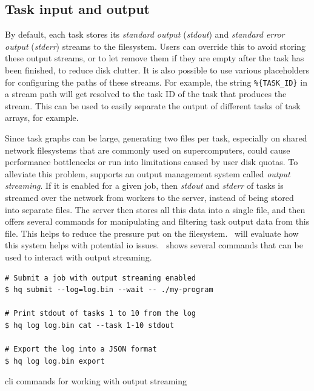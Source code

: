 \subsection{Task input and output}
\label{hq:task-input-and-output}
By default, each \hyperqueue{} task stores its \emph{standard output} (\emph{stdout}) and
\emph{standard error output} (\emph{stderr}) streams to the filesystem. Users can override this to avoid storing these
output streams, or to let \hq{} remove them if they are empty after the task has
been finished, to reduce disk clutter. It is also possible to use various placeholders for
configuring the paths of these streams. For example, the string \texttt{\%\{TASK\_ID\}} in a stream
path will get resolved to the task ID of the task that produces the stream. This can be used to
easily separate the output of different tasks of task arrays, for example.

Since task graphs can be large, generating two files per task, especially on shared network
filesystems that are commonly used on supercomputers, could cause performance bottlenecks or run
into limitations caused by user disk quotas. To alleviate this problem, \hq{}
supports an output management system called \emph{output streaming}. If it is enabled for a given
job, then \emph{stdout} and \emph{stderr} of tasks is streamed over the network
from workers to the server, instead of being stored into separate files. The server then stores all
this data into a single file, and then offers several commands for manipulating and filtering task
output data from this file. This helps to reduce the pressure put on the
filesystem.~ will evaluate how this system helps with potential
\gls{io} issues.~ shows several \hq{}
commands that can be used to interact with output streaming.

\begin{listing}[h]
	\begin{verbatim}
# Submit a job with output streaming enabled
$ hq submit --log=log.bin --wait -- ./my-program

# Print stdout of tasks 1 to 10 from the log
$ hq log log.bin cat --task 1-10 stdout

# Export the log into a JSON format
$ hq log log.bin export
	\end{verbatim}
	\caption{\hyperqueue{} \gls{cli} commands for working with output streaming}
	\label{lst:hq-cli-log}
\end{listing}

